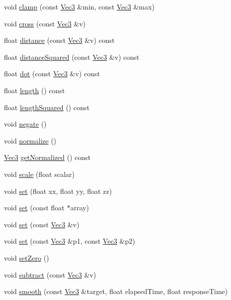 \begin{DoxyCompactItemize}
void \hyperlink{classVec3_a034818aeffd0dc22fd72dd8142687494}{clamp} (const \hyperlink{classVec3}{Vec3} \&min, const \hyperlink{classVec3}{Vec3} \&max)
\item 
void \hyperlink{classVec3_af4d6ddfb98bf0cfc9892f9c0dc479a17}{cross} (const \hyperlink{classVec3}{Vec3} \&v)
\item 
float \hyperlink{classVec3_ae63145f5152b7453d9f2047ccca8b89f}{distance} (const \hyperlink{classVec3}{Vec3} \&v) const
\item 
float \hyperlink{classVec3_acc8f986cd9f852f7872c10d26c651e2e}{distance\+Squared} (const \hyperlink{classVec3}{Vec3} \&v) const
\item 
float \hyperlink{classVec3_a7dde977821ca85d8651f4c91e35d4275}{dot} (const \hyperlink{classVec3}{Vec3} \&v) const
\item 
float \hyperlink{classVec3_a54be9143adb871a478ea3de19ca23f3b}{length} () const
\item 
float \hyperlink{classVec3_a31d057d72313ad255d61fb684a37c24f}{length\+Squared} () const
\item 
void \hyperlink{classVec3_aa770b4935cd7d13e1f2571b326e98ac9}{negate} ()
\item 
void \hyperlink{classVec3_a3a6631559d1d36eaf34ca586ce86ede1}{normalize} ()
\item 
\hyperlink{classVec3}{Vec3} \hyperlink{classVec3_aed345a2ae8ac7a2a76aecf07cec2e0af}{get\+Normalized} () const
\item 
void \hyperlink{classVec3_a62541bd2e79923b7da500bfabeb54b4a}{scale} (float scalar)
\item 
void \hyperlink{classVec3_a75e9107e6297aa63a385f6ff3c17742b}{set} (float xx, float yy, float zz)
\item 
void \hyperlink{classVec3_a61237d7bfe731bd96235a3fe7aeaf6e7}{set} (const float $\ast$array)
\item 
void \hyperlink{classVec3_ab3975270b5f296c9397d51c90765e80e}{set} (const \hyperlink{classVec3}{Vec3} \&v)
\item 
void \hyperlink{classVec3_af3cde4c257ab262d2f86c67a5ff0603b}{set} (const \hyperlink{classVec3}{Vec3} \&p1, const \hyperlink{classVec3}{Vec3} \&p2)
\item 
void \hyperlink{classVec3_a8b09dd643a87bc559ebf6aacb73b7f96}{set\+Zero} ()
\item 
void \hyperlink{classVec3_a7c31a8cd8647e4be1e5c82a5f29d7355}{subtract} (const \hyperlink{classVec3}{Vec3} \&v)
\item 
void \hyperlink{classVec3_a7444b42534c1b629782dd5b1bbb0ca16}{smooth} (const \hyperlink{classVec3}{Vec3} \&target, float elapsed\+Time, float response\+Time)

\end{DoxyCompactItemize}
